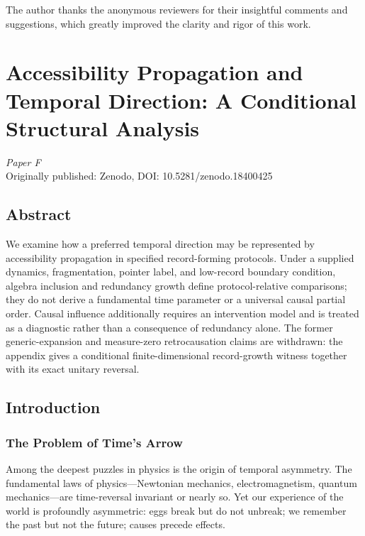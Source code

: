 \documentclass[12pt,a4paper,openany]{book}
\begin{document}
The author thanks the anonymous reviewers for their insightful comments and suggestions, which greatly improved the clarity and rigor of this work.

\chapter{Accessibility Propagation and Temporal Direction: A Conditional Structural Analysis}
\label{H-chap:paperF}

\begin{center}
\textit{Paper F}\\[0.5em]
Originally published: Zenodo, DOI: 10.5281/zenodo.18400425
\end{center}

\bigskip

\section*{Abstract}
We examine how a preferred temporal direction may be represented by accessibility propagation in specified record-forming protocols. Under a supplied dynamics, fragmentation, pointer label, and low-record boundary condition, algebra inclusion and redundancy growth define protocol-relative comparisons; they do not derive a fundamental time parameter or a universal causal partial order. Causal influence additionally requires an intervention model and is treated as a diagnostic rather than a consequence of redundancy alone. The former generic-expansion and measure-zero retrocausation claims are withdrawn: the appendix gives a conditional finite-dimensional record-growth witness together with its exact unitary reversal.


\section{Introduction}
\label{H-F-sec:intro}

\subsection{The Problem of Time's Arrow}

Among the deepest puzzles in physics is the origin of temporal asymmetry. The fundamental laws of physics---Newtonian mechanics, electromagnetism, quantum mechanics---are time-reversal invariant or nearly so. Yet our experience of the world is profoundly asymmetric: eggs break but do not unbreak; we remember the past but not the future; causes precede effects.
\end{document}
